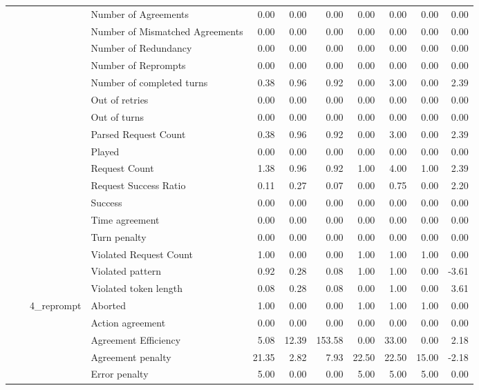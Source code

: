 \begin{tabular}{llllrrrrrrr}
 &  &  & Number of Agreements & 0.00 & 0.00 & 0.00 & 0.00 & 0.00 & 0.00 & 0.00 \\
 &  &  & Number of Mismatched Agreements & 0.00 & 0.00 & 0.00 & 0.00 & 0.00 & 0.00 & 0.00 \\
 &  &  & Number of Redundancy & 0.00 & 0.00 & 0.00 & 0.00 & 0.00 & 0.00 & 0.00 \\
 &  &  & Number of Reprompts & 0.00 & 0.00 & 0.00 & 0.00 & 0.00 & 0.00 & 0.00 \\
 &  &  & Number of completed turns & 0.38 & 0.96 & 0.92 & 0.00 & 3.00 & 0.00 & 2.39 \\
 &  &  & Out of retries & 0.00 & 0.00 & 0.00 & 0.00 & 0.00 & 0.00 & 0.00 \\
 &  &  & Out of turns & 0.00 & 0.00 & 0.00 & 0.00 & 0.00 & 0.00 & 0.00 \\
 &  &  & Parsed Request Count & 0.38 & 0.96 & 0.92 & 0.00 & 3.00 & 0.00 & 2.39 \\
 &  &  & Played & 0.00 & 0.00 & 0.00 & 0.00 & 0.00 & 0.00 & 0.00 \\
 &  &  & Request Count & 1.38 & 0.96 & 0.92 & 1.00 & 4.00 & 1.00 & 2.39 \\
 &  &  & Request Success Ratio & 0.11 & 0.27 & 0.07 & 0.00 & 0.75 & 0.00 & 2.20 \\
 &  &  & Success & 0.00 & 0.00 & 0.00 & 0.00 & 0.00 & 0.00 & 0.00 \\
 &  &  & Time agreement & 0.00 & 0.00 & 0.00 & 0.00 & 0.00 & 0.00 & 0.00 \\
 &  &  & Turn penalty & 0.00 & 0.00 & 0.00 & 0.00 & 0.00 & 0.00 & 0.00 \\
 &  &  & Violated Request Count & 1.00 & 0.00 & 0.00 & 1.00 & 1.00 & 1.00 & 0.00 \\
 &  &  & Violated pattern & 0.92 & 0.28 & 0.08 & 1.00 & 1.00 & 0.00 & -3.61 \\
 &  &  & Violated token length & 0.08 & 0.28 & 0.08 & 0.00 & 1.00 & 0.00 & 3.61 \\
\cline{3-11}
 &  & \multirow[t]{27}{*}{4_reprompt} & Aborted & 1.00 & 0.00 & 0.00 & 1.00 & 1.00 & 1.00 & 0.00 \\
 &  &  & Action agreement & 0.00 & 0.00 & 0.00 & 0.00 & 0.00 & 0.00 & 0.00 \\
 &  &  & Agreement Efficiency & 5.08 & 12.39 & 153.58 & 0.00 & 33.00 & 0.00 & 2.18 \\
 &  &  & Agreement penalty & 21.35 & 2.82 & 7.93 & 22.50 & 22.50 & 15.00 & -2.18 \\
 &  &  & Error penalty & 5.00 & 0.00 & 0.00 & 5.00 & 5.00 & 5.00 & 0.00 \\

\end{tabular}

